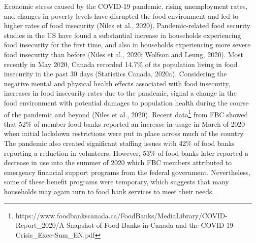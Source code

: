 \documentclass[]{elsarticle} %
\begin{document}
Economic stress caused by the COVID-19 pandemic, rising unemployment
rates, and changes in poverty levels have disrupted the food environment
and led to higher rates of food insecurity (Niles et al., 2020).
Pandemic-related food security studies in the US have found a
substantial increase in households experiencing food insecurity for the
first time, and also in households experiencing more severe food
insecurity than before (Niles et al., 2020; Wolfson and Leung, 2020).
Most recently in May 2020, Canada recorded 14.7\% of its population
living in food insecurity in the past 30 days (Statistics Canada,
2020a). Considering the negative mental and physical health effects
associated with food insecurity, increases in food insecurity rates due
to the pandemic, signal a change in the food environment with potential
damages to population health during the course of the pandemic and
beyond (Niles et al., 2020). Recent data\footnote{https://www.foodbankscanada.ca/FoodBanks/MediaLibrary/COVID-Report\_2020/A-Snapshot-of-Food-Banks-in-Canada-and-the-COVID-19-Crisis\_Exec-Sum\_EN.pdf}
from FBC showed that 52\% of member food banks reported an increase in
usage in March of 2020 when initial lockdown restrictions were put in
place across much of the country. The pandemic also created significant
staffing issues with 42\% of food banks reporting a reduction in
volunteers. However, 53\% of food banks later reported a decrease in use
into the summer of 2020 which FBC members attributed to emergency
financial support programs from the federal government. Nevertheless,
some of these benefit programs were temporary, which suggests that many
households may again turn to food bank services to meet their needs.
\end{document}

